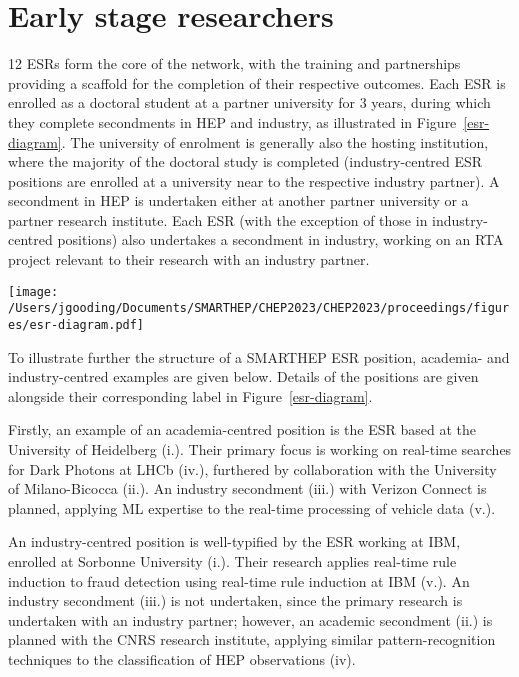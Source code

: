\section{Early stage researchers}
\label{esrs}
12 ESRs form the core of the network, with the training and partnerships providing a scaffold for the completion of their respective outcomes. Each ESR is enrolled as a doctoral student at a partner university for 3 years, during which they complete secondments in HEP and industry, as illustrated in Figure~\ref{esr-diagram}. The university of enrolment is generally also the hosting institution, where the majority of the doctoral study is completed (industry-centred ESR positions are enrolled at a university near to the respective industry partner). A secondment in HEP is undertaken either at another partner university or a partner research institute. Each ESR (with the exception of those in industry-centred positions) also undertakes a secondment in industry, working on an RTA project relevant to their research with an industry partner.

\begin{figure*}[h!]
    \centering
    \texttt{[image: /Users/jgooding/Documents/SMARTHEP/CHEP2023/CHEP2023/proceedings/figures/esr-diagram.pdf]}
    \caption{Structure of a SMARTHEP ESR position. Each ESR is enrolled (i.), during which they will undertake secondments with network partners in HEP (ii.) and industry (iii.). Through the combination of primary and secondment work, each ESR will complete goals in HEP (iv.) and industry (v.), discussed in further detail in Section~\ref{outcomes}. Precise durations of the secondments vary between ESR positions.}
    \label{esr-diagram}
\end{figure*}

To illustrate further the structure of a SMARTHEP ESR position, academia- and industry-centred examples are given below. Details of the positions are given alongside their corresponding label in Figure~\ref{esr-diagram}.

Firstly, an example of an academia-centred position is the ESR based at the University of Heidelberg (i.). Their primary focus is working on real-time searches for Dark Photons at LHCb (iv.), furthered by collaboration with the University of Milano-Bicocca (ii.). An industry secondment (iii.) with Verizon Connect is planned, applying ML expertise to the real-time processing of vehicle data (v.).

An industry-centred position is well-typified by the ESR working at IBM, enrolled at Sorbonne University (i.). Their research applies real-time rule induction to fraud detection using real-time rule induction at IBM (v.). An industry secondment (iii.) is not undertaken, since the primary research is undertaken with an industry partner; however, an academic secondment (ii.) is planned with the CNRS research institute, applying similar pattern-recognition techniques to the classification of HEP observations (iv).
